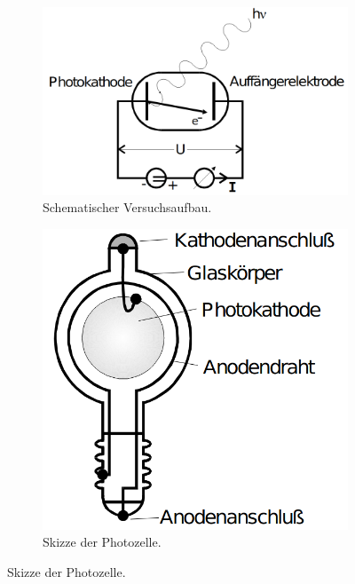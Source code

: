 \begin{figure}
    \centering
    \begin{subfigure}[b]{0.45\linewidth}
        \centering
        \includegraphics[width=\textwidth]{pictures/Anordnung1.png}
        \caption{Schematischer Versuchsaufbau. \cite{AP01}}
        \label{fig:Anordnung1}
    \end{subfigure}
    \hspace{.1\linewidth}%
    \begin{subfigure}[b]{0.3\linewidth}
        \centering
        \includegraphics[width=\textwidth]{pictures/Photozelle.png}
        \caption{Skizze der Photozelle. \cite{AP01}}
        \label{fig:Photozelle}
    \end{subfigure}
\end{figure}

